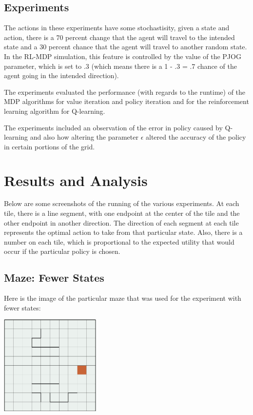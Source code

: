 \documentclass[11pt]{article}
\begin{document}
            \subsection{Experiments}
            
            The actions in these experiments have some stochastisity, given a state and action, there is a 70 percent change
            that the agent will travel to the intended state and a 30 percent chance that the agent will travel to another
            random state. In the RL-MDP simulation, this feature is controlled by the value of the PJOG parameter,
            which is set to .3 (which means there is a 1 - .3 = .7
            chance of the agent going in the intended direction).

            The experiments evaluated the performance (with regards to
            the runtime) of the MDP algorithms
            for value iteration and policy iteration and for the reinforcement learning
            algorithm for Q-learning.

            The experiments included an observation of the error in policy caused by Q-learning
            and also how altering the parameter $\epsilon$ altered the accuracy of the
            policy in certain portions of the grid.

           
        \section{Results and Analysis}

        Below are some screenshots of the running of the various experiments.
        At each tile, there is a line segment, with one endpoint at the center
        of the tile and the other endpoint in another direction. The direction
        of each segment at each tile represents the optimal action to
        take from that particular state. Also, there is a number on each
        tile, which is proportional to the expected utility that would occur
        if the particular policy is chosen.

        \subsection{Maze: Fewer States}

            Here is the image of the particular maze that was used for the
            experiment with fewer states:

            \includegraphics[width=5cm]{../images/small/maze.PNG}
\end{document}
